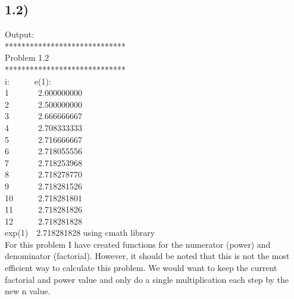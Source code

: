\documentclass{article}
\begin{document}
\subsection*{1.2)} 
Output: \\
***************************** \\
        Problem 1.2\\
*****************************\\
i:~~~~~~e(1):\\
1~~~~~~~2.000000000\\ 
2~~~~~~~2.500000000 \\
3~~~~~~~2.666666667 \\
4~~~~~~~2.708333333 \\
5~~~~~~~2.716666667 \\
6~~~~~~~2.718055556 \\
7~~~~~~~2.718253968 \\
8~~~~~~~2.718278770 \\
9~~~~~~~2.718281526 \\
10~~~~~~2.718281801 \\
11~~~~~~2.718281826 \\
12~~~~~~2.718281828 \\
exp(1)~~2.718281828 using cmath library \\

For this problem I have created functions for the numerator (power) and denominator (factorial). However, it should be noted that this is not the most efficient way to calculate this problem. We would want to keep the current factorial and power value and only do a single multiplication each step by the new n value. 
\end{document}
